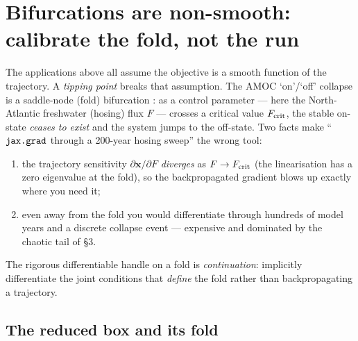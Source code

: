 \section{Bifurcations are non-smooth: calibrate the fold, not the run}
\label{sec:fold}

The applications above all assume the objective is a smooth function of the
trajectory. A \emph{tipping point} breaks that assumption. The AMOC `on'/`off'
collapse is a saddle-node (fold) bifurcation \citep{stommel1961,rahmstorf2005}:
as a control parameter --- here the North-Atlantic freshwater (hosing) flux $F$
--- crosses a critical value $F_{\mathrm{crit}}$, the stable on-state \emph{ceases to exist}
and the system jumps to the off-state. Two facts make
``$\texttt{jax.grad}$ through a 200-year hosing sweep'' the wrong tool:
\begin{enumerate}
  \item the trajectory sensitivity $\partial\mathbf{x}/\partial F$
        \emph{diverges} as $F\to F_{\mathrm{crit}}$ (the linearisation has a zero eigenvalue
        at the fold), so the backpropagated gradient blows up exactly where you
        need it;
  \item even away from the fold you would differentiate through hundreds of model
        years and a discrete collapse event --- expensive and dominated by the
        chaotic tail of \S3.
\end{enumerate}
The rigorous differentiable handle on a fold is \emph{continuation}: implicitly
differentiate the joint conditions that \emph{define} the fold rather than
backpropagating a trajectory.

\subsection*{The reduced box and its fold}


